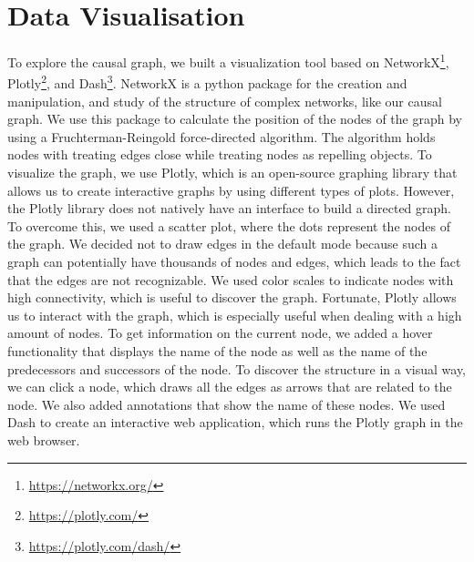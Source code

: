 \section{Data Visualisation}\label{sec:datavisualisation}
To explore the causal graph, we built a visualization tool based on NetworkX\footnote{\url{https://networkx.org/}}, Plotly\footnote{\url{https://plotly.com/}}, and Dash\footnote{\url{https://plotly.com/dash/}}.
NetworkX is a python package for the creation and manipulation, and study of the structure of complex networks, like our causal graph.
We use this package to calculate the position of the nodes of the graph by using a Fruchterman-Reingold force-directed algorithm.
The algorithm holds nodes with treating edges close while treating nodes as repelling objects.
To visualize the graph, we use Plotly, which is an open-source graphing library that allows us to create interactive graphs by using different types of plots.
However, the Plotly library does not natively have an interface to build a directed graph.
To overcome this, we used a scatter plot, where the dots represent the nodes of the graph.
We decided not to draw edges in the default mode because such a graph can potentially have thousands of nodes and edges, which leads to the fact that the edges are not recognizable.
We used color scales to indicate nodes with high connectivity, which is useful to discover the graph.
Fortunate, Plotly allows us to interact with the graph, which is especially useful when dealing with a high amount of nodes.
To get information on the current node, we added a hover functionality that displays the name of the node as well as the name of the predecessors and successors of the node.
To discover the structure in a visual way, we can click a node, which draws all the edges as arrows that are related to the node.
We also added annotations that show the name of these nodes.
We used Dash to create an interactive web application, which runs the Plotly graph in the web browser.
